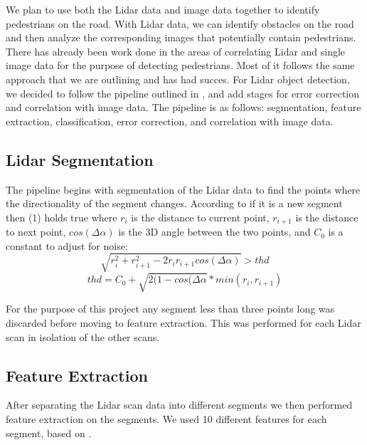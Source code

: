 \documentclass[10pt,twocolumn,letterpaper]{article}
\begin{document}
  We plan to use both the Lidar data and image data together to identify 
  pedestrians on the road. With Lidar data, we can identify obstacles on the 
  road and then analyze the corresponding images that potentially contain 
  pedestrians. There has already been work done in the areas of correlating 
  Lidar and single image data for the purpose of detecting pedestrians. Most 
  of it follows the same approach that we are outlining and has had succes. 
  For Lidar object detection, we decided to follow the pipeline outlined 
  in \cite{journal}, and add stages for error correction and correlation with 
  image data. The pipeline is as follows: segmentation, feature
  extraction, classification, error correction, and correlation with image data.
  
  \subsection{Lidar Segmentation}
  The pipeline begins with segmentation of the Lidar data 
  to find the points where the directionality of the segment changes. 
  According to \cite{conf} if it 
  is a new segment then (1) holds true where $r_i$ is the 
  distance to current point, $r_{i+1}$ is the distance to next point, 
  $cos(\Delta \alpha)$ is the 3D angle between the two points, and $C_0$ is a 
  constant to adjust for noise:
   \begin{equation} \sqrt{r_{i}^{2} + r_{i+1}^{2} - 2 r_{i} r_{i+1}
   cos(\Delta \alpha)} > thd \end{equation}
   \begin{equation} thd = C_0 + \sqrt{2(1-cos(\Delta \alpha} * min(r_i,
   r_{i+1}) \end{equation}

  For the purpose of this project any segment less than three points long was 
  discarded before moving to feature extraction. This was performed for each 
  Lidar scan in isolation of the other scans. 

  \subsection{Feature Extraction}
  After separating the Lidar scan data into different segments we then 
  performed feature extraction on the segments. We used 10 different features 
  for each segment, based on \cite{journal}.
\end{document}

